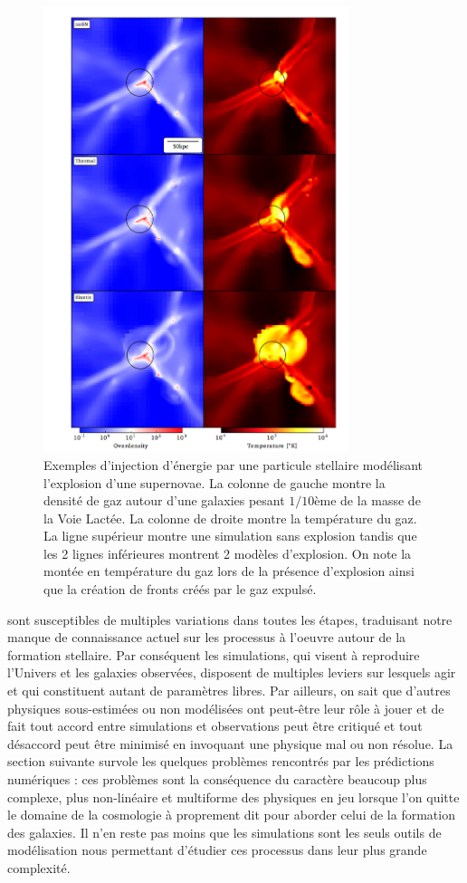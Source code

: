 \begin{figure}[htbp]
	\centering
		\includegraphics[height=13cm]{figs/SN.png}
	\caption{Exemples d'injection d'énergie par une particule stellaire modélisant l'explosion d'une supernovae. La colonne de gauche montre la densité de gaz autour d'une galaxies pesant $1/10$ème de la masse de la Voie Lactée. La colonne de droite montre la température du gaz. La ligne supérieur montre une simulation sans explosion tandis que les 2 lignes inférieures montrent 2 modèles d'explosion. On note la montée en température du gaz lors de la présence d'explosion ainsi que la création de fronts créés par le gaz expulsé.}
	\label{f:SN}
\end{figure}


 sont susceptibles de multiples variations dans toutes les étapes, traduisant notre manque de connaissance actuel sur les processus à l'oeuvre autour de la formation stellaire. Par conséquent les simulations, qui visent à reproduire l'Univers et les galaxies observées, disposent de multiples leviers sur lesquels agir et qui constituent autant de paramètres libres. Par ailleurs, on sait que d'autres physiques sous-estimées ou non modélisées ont peut-être leur rôle à jouer et de fait tout accord entre simulations et observations peut être critiqué et tout désaccord peut être minimisé en invoquant une physique mal ou non résolue. La section suivante survole les quelques problèmes rencontrés par les prédictions numériques : ces problèmes sont la conséquence du caractère beaucoup plus complexe, plus non-linéaire et multiforme des physiques en jeu lorsque l'on quitte le domaine de la cosmologie à proprement dit pour aborder celui de la formation des galaxies. Il n'en reste pas moins que les simulations sont les seuls outils de modélisation nous permettant d'étudier ces processus dans leur plus grande complexité.

